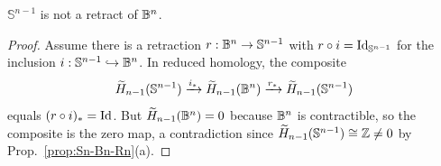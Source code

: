 \begin{corollary}\label{cor:2.10}
$\mathbb{S}^{n-1}$ is not a retract of $\mathbb{B}^n$.
\end{corollary}

\begin{proof}
Assume there is a retraction $r:\mathbb{B}^n\to \mathbb{S}^{n-1}$ with $r\circ i=\operatorname{Id}_{\mathbb{S}^{n-1}}$
for the inclusion $i:\mathbb{S}^{n-1}\hookrightarrow \mathbb{B}^n$. In reduced homology, the composite
\[
\widetilde H_{n-1}(\mathbb{S}^{n-1}) \xrightarrow{i_*}
\widetilde H_{n-1}(\mathbb{B}^n) \xrightarrow{r_*} \widetilde H_{n-1}(\mathbb{S}^{n-1})
\]
equals $(r\circ i)_*=\operatorname{Id}$.
But $\widetilde H_{n-1}(\mathbb{B}^n)=0$ because $\mathbb{B}^n$ is contractible, so the composite is
the zero map, a contradiction since $\widetilde H_{n-1}(\mathbb{S}^{n-1})\cong\Bbb Z\neq 0$
by Prop.~\ref{prop:Sn-Bn-Rn}(a).
\end{proof}

